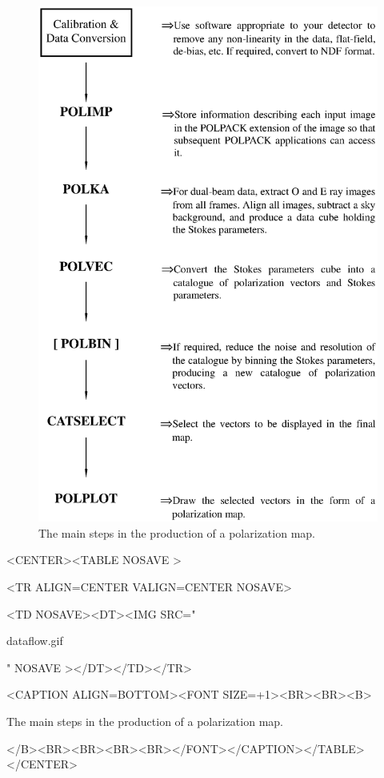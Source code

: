 \documentclass[twoside,11pt]{article}
\newenvironment{latexonly}{}{}
\renewcommand{\_}{\texttt{\symbol{95}}}
\newcommand{\htmlfig}[3]{
   \label{#1}
   \begin{rawhtml} <CENTER><TABLE NOSAVE > \end{rawhtml}
   \begin{rawhtml} <TR ALIGN=CENTER VALIGN=CENTER NOSAVE> \end{rawhtml}
   \begin{rawhtml} <TD NOSAVE><DT><IMG SRC=" \end{rawhtml}
   #2
   \begin{rawhtml} " NOSAVE ></DT></TD></TR> \end{rawhtml}
   \begin{rawhtml} <CAPTION ALIGN=BOTTOM><FONT SIZE=+1><BR><BR><B> \end{rawhtml}
   #3 
   \begin{rawhtml} </B><BR><BR><BR><BR></FONT></CAPTION></TABLE></CENTER> \end{rawhtml}
}
\begin{document}
\begin{latexonly}
  \begin{figure}[htpb]
  \begin{center}
  \includegraphics[clip,scale=0.7]{sun223_figures/dataflow.eps}
  \vspace{4mm}
  \caption{The main steps in the production of a polarization map.}
  \label{fig:dataflow}
  \end{center}
  \end{figure}
\end{latexonly}

\begin{htmlonly}
\htmlfig{fig:dataflow}{dataflow.gif}{
The main steps in the production of a polarization map.}
\end{htmlonly}
\end{document}
